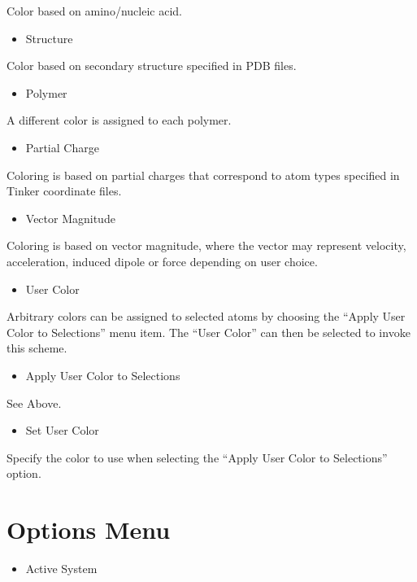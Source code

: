 \documentclass[letterpaper,11pt,english]{sphinxmanual}
\begin{document}
Color based on amino/nucleic acid.
\begin{itemize}
\item {} 
Structure

\end{itemize}

Color based on secondary structure specified in PDB files.
\begin{itemize}
\item {} 
Polymer

\end{itemize}

A different color is assigned to each polymer.
\begin{itemize}
\item {} 
Partial Charge

\end{itemize}

Coloring is based on partial charges that correspond to atom types specified in Tinker coordinate files.
\begin{itemize}
\item {} 
Vector Magnitude

\end{itemize}

Coloring is based on vector magnitude, where the vector may represent velocity, acceleration, induced dipole or force depending on user choice.
\begin{itemize}
\item {} 
User Color

\end{itemize}

Arbitrary colors can be assigned to selected atoms by choosing the “Apply User Color to Selections” menu item. The “User Color” can then be selected to invoke this scheme.
\begin{itemize}
\item {} 
Apply User Color to Selections

\end{itemize}

See Above.
\begin{itemize}
\item {} 
Set User Color

\end{itemize}

Specify the color to use when selecting the “Apply User Color to Selections” option.


\section{Options Menu}
\label{\detokenize{text/menus:options-menu}}\begin{itemize}
\item {} 
Active System

\end{itemize}
\end{document}
